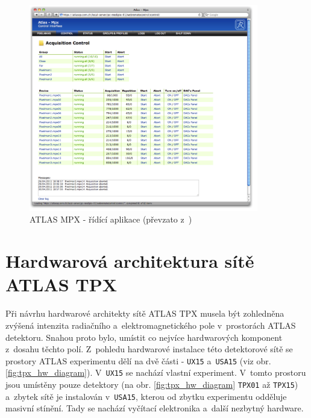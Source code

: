 \begin{figure}[ht]
	\begin{center}
		\includegraphics[width=10cm]{figures/mpx_web.png}
		\caption{ATLAS MPX - řídící aplikace (převzato z~\cite{TurecekThesis2011})}
		\label{fig:mpx_web}
	\end{center}
\end{figure}

\section{Hardwarová architektura sítě ATLAS TPX}\label{atlas:hw_arch}
Při návrhu hardwarové architekty sítě ATLAS TPX musela být zohledněna zvýšená intenzita radiačního a~elektromagnetického pole v~prostorách ATLAS detektoru. Snahou proto bylo, umístit co nejvíce hardwarových komponent z~dosahu těchto polí. Z~pohledu hardwarové instalace této detektorové sítě se prostory ATLAS experimentu dělí na dvě části - \texttt{UX15} a~\texttt{USA15} (viz obr. \ref{fig:tpx_hw_diagram}). V~\texttt{UX15} se nachází vlastní experiment. V~tomto prostoru jsou umístěny pouze detektory (na obr. \ref{fig:tpx_hw_diagram} \texttt{TPX01} až \texttt{TPX15}) a~zbytek sítě je instalován v~\texttt{USA15}, kterou od zbytku experimentu odděluje masivní stínění. Tady se nachází vyčítací elektronika a~další nezbytný hardware.

